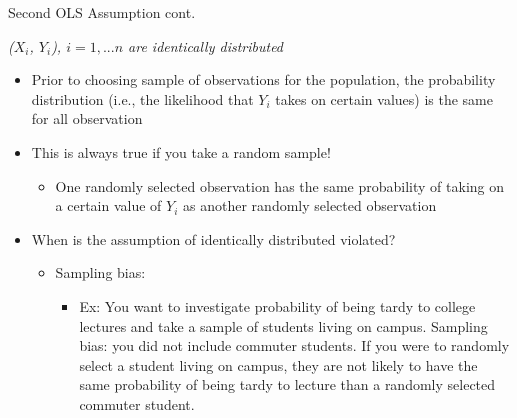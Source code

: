 \documentclass[8pt,ignorenonframetext,dvipsnames]{beamer}
\providecommand{\tightlist}{%
  \setlength{\itemsep}{0pt}\setlength{\parskip}{0pt}}
\let\olditem\item
\renewcommand{\item}{%
  \olditem\vspace{4pt}
}
\begin{document}
\begin{frame}{Second OLS Assumption cont.}
\protect\hypertarget{second-ols-assumption-cont.}{}

\emph{(\(X_i\), \(Y_i\)), \(i=1, ...n\) are identically distributed}

\begin{itemize}
\tightlist
\item
  Prior to choosing sample of observations for the population, the
  probability distribution (i.e., the likelihood that \(Y_i\) takes on
  certain values) is the same for all observation
\item
  This is always true if you take a random sample!

  \begin{itemize}
  \tightlist
  \item
    One randomly selected observation has the same probability of taking
    on a certain value of \(Y_i\) as another randomly selected
    observation
  \end{itemize}
\item
  When is the assumption of identically distributed violated?

  \begin{itemize}
  \tightlist
  \item
    Sampling bias:

    \begin{itemize}
    \tightlist
    \item
      Ex: You want to investigate probability of being tardy to college
      lectures and take a sample of students living on campus. Sampling
      bias: you did not include commuter students. If you were to
      randomly select a student living on campus, they are not likely to
      have the same probability of being tardy to lecture than a
      randomly selected commuter student.
    \end{itemize}
  \end{itemize}
\end{itemize}

\end{frame}
\end{document}
